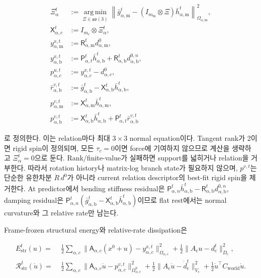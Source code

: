\documentclass[11pt,a4paper]{article}
\newcommand{\argmin}{\operatorname*{arg\,min}}
\begin{document}
\begin{equation}
\begin{aligned}
  \Xi_\alpha^t
  &:=
  \argmin_{\Xi\in\mathfrak{so}(3)}
  \left\|
  \bar g_{\alpha,\mathrm m}^t
  -(I_{m_{\mathrm m}}\otimes\Xi)\bar h_{\alpha,\mathrm m}^t
  \right\|_{\Omega_{\alpha,\mathrm m}}^2,\\
  \mathsf X_{\alpha,c}^t
  &:={}I_{m_c}\otimes\Xi_\alpha^t,\\
  y_{\alpha,\mathrm m}^{x,t}
  &:={}\mathsf R_{\alpha,\mathrm m}^td_{\alpha,\mathrm m}^0,\\
  y_{\alpha,\mathrm b}^{x,t}
  &:={}\mathsf P_{\alpha,t}^t\bar h_{\alpha,\mathrm b}^t
  +\mathsf R_{\alpha,\mathrm b}^td_{\alpha,\mathrm b}^{0,n},\\
  p_{\alpha,c}^{u,t}
  &:={}y_{\alpha,c}^{x,t}-d_{\alpha,c}^0,\\
  \bar r_{\alpha,\mathrm b}^{v,t}
  &:={}\bar g_{\alpha,\mathrm b}^t
  -\mathsf X_{\alpha,\mathrm b}^t\bar h_{\alpha,\mathrm b}^t,\\
  p_{\alpha,\mathrm m}^{v,t}
  &:={}\mathsf X_{\alpha,\mathrm m}^t\bar h_{\alpha,\mathrm m}^t,\\
  p_{\alpha,\mathrm b}^{v,t}
  &:={}\mathsf X_{\alpha,\mathrm b}^t\bar h_{\alpha,\mathrm b}^t
  +\mathsf P_{\alpha,t}^t\bar r_{\alpha,\mathrm b}^{v,t}
  \label{eq:projective-relation-targets}
\end{aligned}
\end{equation}

로 정의한다. 이는 relation마다 최대 \(3\times3\) normal equation이다.
Tangent rank가 2이면 rigid spin이 정의되며, 모든 \(\tau_c=0\)이면 force에 기여하지 않으므로
계산을 생략하고 \(\Xi_\alpha^t=0\)으로 둔다. Rank/finite-value가 실패하면 support를 넓히거나 relation을 거부한다.
따라서 rotation history나 matrix-log branch state가 필요하지 않으며,
\(p^{v,t}\)는 단순한 유한차분 \(\dot R\,d^0\)가 아니라 current relation descriptor의
best-fit rigid spin을 제거한다.
At predictor에서 bending stiffness residual은
\(\mathsf P_{\alpha,n}^t\bar h_{\alpha,\mathrm b}^t-
\mathsf R_{\alpha,\mathrm b}^td_{\alpha,\mathrm b}^{0,n}\),
damping residual은
\(\mathsf P_{\alpha,n}^t(\bar g_{\alpha,\mathrm b}^t-
\mathsf X_{\alpha,\mathrm b}^t\bar h_{\alpha,\mathrm b}^t)\)이므로
flat rest에서는 normal curvature와 그 relative rate만 남는다.

Frame-frozen structural energy와 relative-rate dissipation은

\begin{equation}
\begin{aligned}
  E_{\mathrm{str}}^t(u)
  =&\;\frac12\sum_{\alpha,c}
  \|\mathsf A_{\alpha,c}(x^0+u)
    -y_{\alpha,c}^{x,t}\|_{\Omega_{\alpha,c}}^2
  +\frac12\|A_{\mathrm c}u-d_{\mathrm c}^t\|_{D_{\mathrm c}}^2,\\
  \mathcal R_{\mathrm{str}}^t(\dot u)
  =&\;\frac12\sum_{\alpha,c}
  \|\mathsf A_{\alpha,c}\dot u-p_{\alpha,c}^{v,t}\|_{\Omega_{\alpha,c}^{\eta}}^2
  +\frac12\|A_{\mathrm c}\dot u-\dot d_{\mathrm c}^t\|_{V_{\mathrm c}}^2
  +\frac12\dot u^\top C_{\mathrm{world}}\dot u .
  \label{eq:projective-structural-energy}
\end{aligned}
\end{equation}
\end{document}
